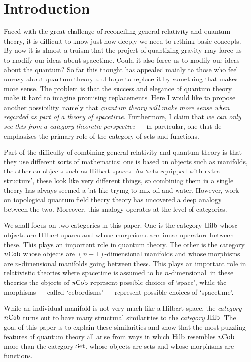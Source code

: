 \documentclass[12pt]{article}
\newcommand{\Set}{{\rm Set}}
\newcommand{\Hilb}{{\rm Hilb}}
\newcommand{\Cob}{{\rm Cob}}
\begin{document}
\section{Introduction}

Faced with the great challenge of reconciling general relativity and quantum 
theory, it is difficult to know just how deeply we need to rethink basic 
concepts. By now it is almost a truism that the project of quantizing gravity 
may force us to modify our ideas about spacetime.  Could it also force us 
to modify our ideas about the quantum?  So far this thought has appealed 
mainly to those who feel uneasy about quantum theory and hope to replace 
it by something that makes more sense.  The problem is that the success 
and elegance of quantum theory make it hard to imagine promising
replacements.  Here I would like to propose another possibility, namely 
that {\it quantum theory will make more sense when regarded as part of 
a theory of spacetime}.  Furthermore, I claim that {\it we can only see 
this from a category-theoretic perspective} --- in particular, one that 
de-emphasizes the primary role of the category of sets and functions.   

Part of the difficulty of combining general relativity and quantum theory is
that they use different sorts of mathematics: one is based on objects 
such as manifolds, the other on objects such as Hilbert spaces.  As 
`sets equipped with extra structure', these look like very different 
things, so combining them in a single theory has always seemed a bit 
like trying to mix oil and water.  However, work on topological quantum 
field theory theory has uncovered a deep analogy between the two.  
Moreover, this analogy operates at the level of categories.  

We shall focus on two categories in this paper.  One is the category 
$\Hilb$ whose objects are Hilbert spaces and whose 
morphisms are linear operators between these.  This plays an important 
role in quantum theory.  The other is the category $n\Cob$ whose objects
are $(n-1)$-dimensional manifolds and whose morphisms are $n$-dimensional 
manifolds going between these.  This plays an important role in 
relativistic theories where spacetime is assumed to be $n$-dimensional:
in these theories the objects of $n\Cob$ represent possible choices of 
`space', while the morphisms --- called `cobordisms' --- represent 
possible choices of `spacetime'.

While an individual manifold is not very much like a Hilbert space,
the {\it category} $n\Cob$ turns out to have many structural
similarities to the {\it category} $\Hilb$.  The goal of this paper is
to explain these similarities and show that the most puzzling features
of quantum theory all arise from ways in which $\Hilb$ resembles
$n\Cob$ more than the category $\Set$, whose objects are sets and
whose morphisms are functions.
\end{document}
